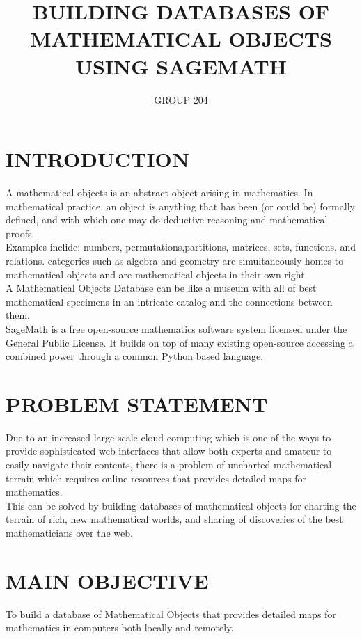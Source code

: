 \documentclass[11pt]{article} %
\title{BUILDING DATABASES OF MATHEMATICAL OBJECTS USING SAGEMATH}
\author{GROUP 204}
\begin{document}
\maketitle

\section{INTRODUCTION}
A mathematical objects is an abstract object arising in mathematics.
In mathematical practice, an object is anything that has been (or could be) formally defined, and with which one may do deductive reasoning and mathematical proofs.\\
Examples inclide: numbers, permutations,partitions, matrices, sets, functions, and relations.
categories such as algebra and geometry are simultaneously homes to mathematical objects and are mathematical objects in their own right.\\
A Mathematical Objects Database can be like a museum with all of best
mathematical specimens in an intricate catalog and the connections
between them.\\SageMath is a free open-source mathematics software
system licensed under the General Public License. It builds on top of
many existing open-source accessing a combined power through a common
Python based language.


\section{PROBLEM STATEMENT}

Due to an increased large-scale cloud computing which is one of the ways to provide sophisticated web interfaces that allow both experts and amateur to easily navigate their contents, there is a problem of uncharted mathematical terrain which requires online resources that provides detailed maps for mathematics.\\This can be solved by building databases of mathematical objects for charting the terrain of rich, new mathematical worlds, and sharing of discoveries of the best mathematicians over the web.


\section{MAIN OBJECTIVE}

To build a database of Mathematical Objects that provides detailed maps for mathematics in computers both locally and remotely.
\end{document}
